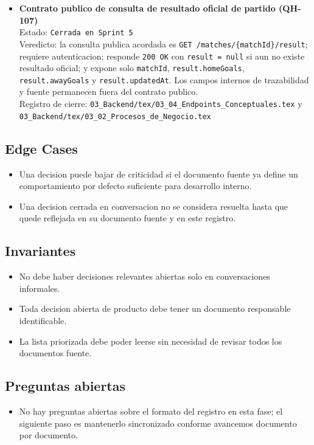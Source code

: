 \begin{itemize}
  \item \textbf{Contrato publico de consulta de resultado oficial de partido (QH-107)}\\
  Estado: \texttt{Cerrada en Sprint 5}\\
  Veredicto: la consulta publica acordada es \texttt{GET /matches/\{matchId\}/result}; requiere autenticacion; responde \texttt{200 OK} con \texttt{result = null} si aun no existe resultado oficial; y expone solo \texttt{matchId}, \texttt{result.homeGoals}, \texttt{result.awayGoals} y \texttt{result.updatedAt}. Los campos internos de trazabilidad y fuente permanecen fuera del contrato publico.\\
  Registro de cierre: \texttt{03\_Backend/tex/03\_04\_Endpoints\_Conceptuales.tex} y \texttt{03\_Backend/tex/03\_02\_Procesos\_de\_Negocio.tex}
\end{itemize}

\subsection{Edge Cases}

\begin{itemize}
  \item Una decision puede bajar de criticidad si el documento fuente ya define un comportamiento por defecto suficiente para desarrollo interno.
  \item Una decision cerrada en conversacion no se considera resuelta hasta que quede reflejada en su documento fuente y en este registro.
\end{itemize}

\subsection{Invariantes}

\begin{itemize}
  \item No debe haber decisiones relevantes abiertas solo en conversaciones informales.
  \item Toda decision abierta de producto debe tener un documento responsable identificable.
  \item La lista priorizada debe poder leerse sin necesidad de revisar todos los documentos fuente.
\end{itemize}

\subsection{Preguntas abiertas}

\begin{itemize}
  \item No hay preguntas abiertas sobre el formato del registro en esta fase; el siguiente paso es mantenerlo sincronizado conforme avancemos documento por documento.
\end{itemize}
